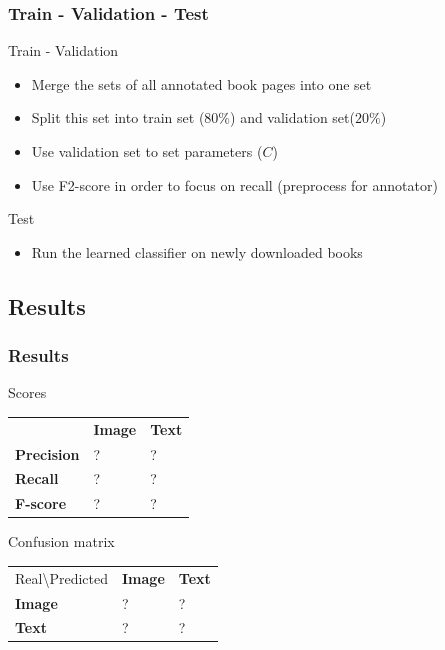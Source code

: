 \begin{frame}
\frametitle{Train - Validation - Test}

\begin{block}{Train - Validation}
\begin{itemize}
\item Merge the sets of all annotated book pages into one set
\item Split this set into train set ($80\%$) and validation set($20\%$)
\item Use validation set to set parameters ($C$)
\item Use F2-score in order to focus on recall (preprocess for annotator)
\end{itemize}
\end{block}

\begin{block}{Test}
\begin{itemize}
\item Run the learned classifier on newly downloaded books
\end{itemize}
\end{block}
\end{frame}

\subsection{Results}
\begin{frame}
\frametitle{Results}

\begin{block}{Scores}
\begin{tabular}{l l l }
  & \textbf{Image} & \textbf{Text}\\
\textbf{Precision} & ? & ? \\
\textbf{Recall} & ? & ? \\
\textbf{F-score} & ? & ?  
\end{tabular}
\end{block}

\begin{block}{Confusion matrix}
\begin{tabular}{l l l }
Real\textbackslash Predicted & \textbf{Image} & \textbf{Text} \\
\textbf{Image} & ?  & ?  \\
\textbf{Text} & ?  & ?
\end{tabular}
\end{block}


\end{frame}
